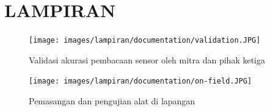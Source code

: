 \chapter*{LAMPIRAN}


\begin{figure}[!h]
    \texttt{[image: images/lampiran/documentation/validation.JPG]}
    \caption{Validasi akurasi pembacaan sensor oleh mitra dan pihak ketiga}
    \label{fig:doc-validation}
\end{figure}

\begin{figure}[!h]
    \texttt{[image: images/lampiran/documentation/on-field.JPG]}
    \caption{Pemasangan dan pengujian alat di lapangan}
    \label{fig:doc-lapangan}
\end{figure}


